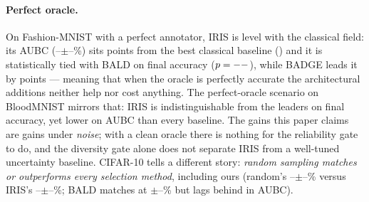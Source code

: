 \documentclass[a4paper,fleqn,longmktitle]{cas-sc}
\newcommand{\method}{IRIS}
\providecommand{\FmnistCleanIrisAubc}{--}\providecommand{\FmnistCleanIrisAubcStd}{--}
\providecommand{\CifarCleanIrisFinal}{--}\providecommand{\CifarCleanIrisFinalStd}{--}
\providecommand{\CifarCleanRandomFinal}{--}\providecommand{\CifarCleanRandomFinalStd}{--}
\providecommand{\CifarCleanBaldFinalStd}{--}\providecommand{\CifarNoisyIrisPairedP}{--}
\begin{document}
\paragraph{Perfect oracle.} On Fashion-MNIST with a perfect annotator,
\method{} is level with the
classical field: its AUBC (\FmnistCleanIrisAubc$\pm$\FmnistCleanIrisAubcStd\%)
sits \FmnistCleanIrisClassicAubcGain{} points from the best classical
baseline (\FmnistCleanBestClassicName) and it is statistically tied with
BALD on final accuracy ($p=--$), while BADGE
leads it by \FmnistCleanBadgeOverIrisFinal{} points --- meaning that when the oracle is perfectly accurate
the architectural additions neither help nor cost anything. The
perfect-oracle scenario on BloodMNIST mirrors that: \method{} is
indistinguishable from the leaders on final accuracy, yet lower on
AUBC than every baseline. The gains this paper claims are gains under
\emph{noise}; with a clean oracle there is nothing for the reliability
gate to do, and the diversity gate alone does not separate \method{}
from a well-tuned uncertainty baseline. CIFAR-10 tells a different
story: \emph{random sampling matches or outperforms every selection
method}, including ours (random's
\CifarCleanRandomFinal$\pm$\CifarCleanRandomFinalStd\% versus
\method{}'s \CifarCleanIrisFinal$\pm$\CifarCleanIrisFinalStd\%; BALD
matches at \CifarCleanBaldFinal$\pm$\CifarCleanBaldFinalStd\% but lags
behind in AUBC).
\end{document}
